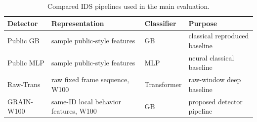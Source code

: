 \begin{table}[H]
\caption{Compared IDS pipelines used in the main evaluation.}\label{tab:pipelines}
\centering\small
\begin{tabular}{llll}
\hline
Detector & Representation & Classifier & Purpose \\
\hline
Public GB & sample public-style features & GB & classical reproduced baseline \\
Public MLP & sample public-style features & MLP & neural classical baseline \\
Raw-Trans & raw fixed frame sequence, W100 & Transformer & raw-window deep baseline \\
GRAIN-W100 & same-ID local behavior features, W100 & GB & proposed detector pipeline \\
\hline
\end{tabular}
\end{table}
